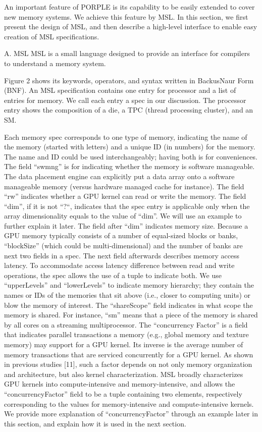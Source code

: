 \documentclass{sig-alternate}
\begin{document}
An important feature of PORPLE is its capability to be easily extended to cover new memory systems. We achieve this feature by MSL. In this section, we first present the design of MSL, and then describe a high-level interface to enable easy creation of MSL specifications.

A. MSL
MSL is a small language designed to provide an interface for compilers to understand a memory system.

Figure 2 shows its keywords, operators, and syntax written in BackusNaur Form (BNF). An MSL specification contains one entry for processor and a list of entries for memory. We call each entry a spec in our discussion. The processor entry shows the composition of a die, a TPC (thread processing cluster), and an SM.

Each memory spec corresponds to one type of memory, indicating the name of the memory (started with letters) and a unique ID (in numbers) for the memory. The name and ID could be used interchangeably; having both is for conveniences. The field “swmng” is for indicating whether the memory is software manageable. The data placement engine can explicitly put a data array onto a software manageable memory (versus hardware managed cache for instance). The field “rw” indicates whether a GPU kernel can read or write the memory. The field “dim”, if it is not “?“, indicates that the spec entry is applicable only when the array dimensionality equals to the value of “dim”. We will use an example to further explain it later. The field after “dim” indicates memory size. Because a GPU memory typically consists of a number of equal-sized blocks or banks, “blockSize” (which could be multi-dimensional) and the number of banks are next two fields in a spec. The next field afterwards describes memory access latency. To accommodate access latency difference between read and write operations, the spec allows the use of a tuple to indicate both. We use “upperLevels” and “lowerLevels” to indicate memory hierarchy; they contain the names or IDs of the memories that sit above (i.e., closer to computing units) or blow the memory of interest. The “shareScope” field indicates in what scope the memory is shared. For instance, “sm” means that a piece of the memory is shared by all cores on a streaming multiprocessor. The “concurrency Factor” is a field that indicates parallel transactions a memory (e.g., global memory and texture memory) may support for a GPU kernel. Its inverse is the average number of memory transactions that are serviced concurrently for a GPU kernel. As shown in previous studies [11], such a factor depends on not only memory organization and architecture, but also kernel characterization. MSL broadly characterizes GPU kernels into compute-intensive and memory-intensive, and allows the “concurrencyFactor” field to be a tuple containing two elements, respectively corresponding to the values for memory-intensive and compute-intensive kernels. We provide more explanation of “concurrencyFactor” through an example later in this section, and explain how it is used in the next section.
\end{document}
